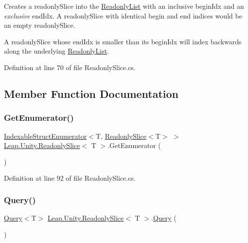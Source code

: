 Creates a readonly\+Slice into the \mbox{\hyperlink{struct_leap_1_1_unity_1_1_readonly_list}{Readonly\+List}} with an inclusive begin\+Idx and an {\itshape exclusive} end\+Idx. A readonly\+Slice with identical begin and end indices would be an empty readonly\+Slice. 

A readonly\+Slice whose end\+Idx is smaller than its begin\+Idx will index backwards along the underlying \mbox{\hyperlink{struct_leap_1_1_unity_1_1_readonly_list}{Readonly\+List}}. 

Definition at line 70 of file Readonly\+Slice.\+cs.



\subsection{Member Function Documentation}
\mbox{\label{struct_leap_1_1_unity_1_1_readonly_slice_aa0a31eee8c64bcb819fee93c017c80c1}} 
\subsubsection{\texorpdfstring{GetEnumerator()}{GetEnumerator()}}
{\footnotesize\ttfamily \mbox{\hyperlink{struct_leap_1_1_unity_1_1_indexable_struct_enumerator}{Indexable\+Struct\+Enumerator}}$<$T, \mbox{\hyperlink{struct_leap_1_1_unity_1_1_readonly_slice}{Readonly\+Slice}}$<$T$>$ $>$ \mbox{\hyperlink{struct_leap_1_1_unity_1_1_readonly_slice}{Leap.\+Unity.\+Readonly\+Slice}}$<$ T $>$.Get\+Enumerator (\begin{DoxyParamCaption}{ }\end{DoxyParamCaption})}



Definition at line 92 of file Readonly\+Slice.\+cs.

\mbox{\label{struct_leap_1_1_unity_1_1_readonly_slice_af4b44e3656104f31d5673f9865d5d971}} 
\subsubsection{\texorpdfstring{Query()}{Query()}}
{\footnotesize\ttfamily \mbox{\hyperlink{struct_leap_1_1_unity_1_1_query_1_1_query}{Query}}$<$T$>$ \mbox{\hyperlink{struct_leap_1_1_unity_1_1_readonly_slice}{Leap.\+Unity.\+Readonly\+Slice}}$<$ T $>$.\mbox{\hyperlink{struct_leap_1_1_unity_1_1_query_1_1_query}{Query}} (\begin{DoxyParamCaption}{ }\end{DoxyParamCaption})}



